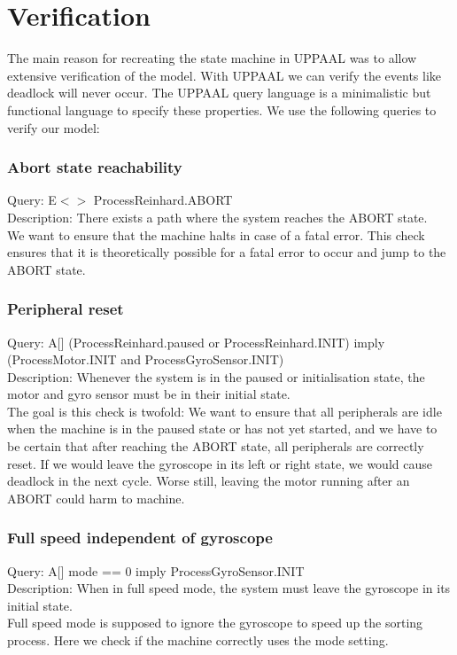 \documentclass[a4paper,oneside,11pt]{article}
\begin{document}
\section{Verification}
The main reason for recreating the state machine in UPPAAL was to allow extensive verification of the model. With UPPAAL we can verify the events like deadlock will never occur. The UPPAAL query language is a minimalistic but functional language to specify these properties. We use the following queries to verify our model:

\subsubsection{Abort state reachability}
Query: E$<>$ ProcessReinhard.ABORT \\
Description: There exists a path where the system reaches the ABORT state.\\
We want to ensure that the machine halts in case of a fatal error. This check ensures that it is theoretically possible for a fatal error to occur and jump to the ABORT state.

\subsubsection{Peripheral reset}
Query: A[] (ProcessReinhard.paused or ProcessReinhard.INIT) imply (ProcessMotor.INIT and ProcessGyroSensor.INIT) \\
Description: Whenever the system is in the paused or initialisation state, the motor and gyro sensor must be in their initial state. \\
The goal is this check is twofold: We want to ensure that all peripherals are idle when the machine is in the paused state or has not yet started, and we have to be certain that after reaching the ABORT state, all peripherals are correctly reset. If we would leave the gyroscope in its left or right state, we would cause deadlock in the next cycle. Worse still, leaving the motor running after an ABORT could harm to machine.

\subsubsection{Full speed independent of gyroscope}
Query: A[] mode == 0 imply ProcessGyroSensor.INIT \\
Description: When in full speed mode, the system must leave the gyroscope in its initial state. \\
Full speed mode is supposed to ignore the gyroscope to speed up the sorting process. Here we check if the machine correctly uses the mode setting.
\end{document}
